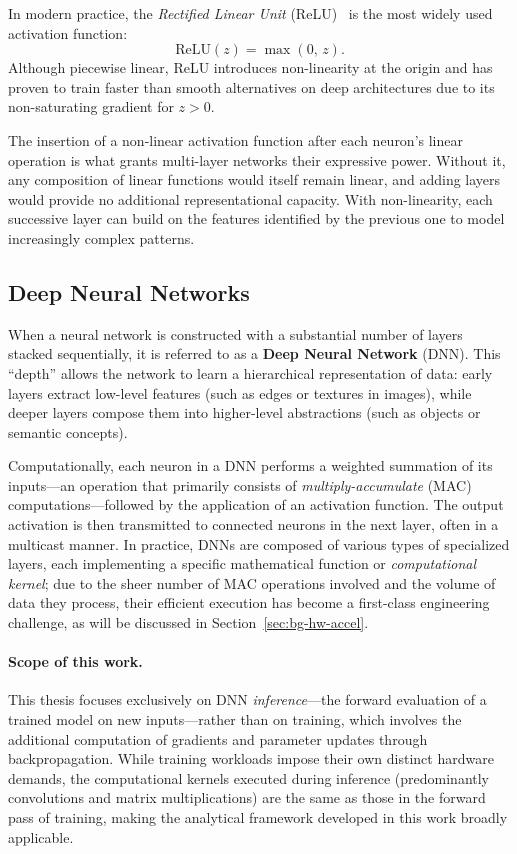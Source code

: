 In modern practice, the \emph{Rectified Linear Unit}
(ReLU)~\cite{relu_glorot} is the most widely used activation function:
\begin{equation}
\label{eq:relu}
\text{ReLU}(z) = \max(0,\,z).
\end{equation}
Although piecewise linear, ReLU introduces non-linearity at the origin and
has proven to train faster than smooth alternatives on deep architectures
due to its non-saturating gradient for $z > 0$.

The insertion of a non-linear activation function after each neuron's
linear operation is what grants multi-layer networks their expressive power.
Without it, any composition of linear functions would itself remain
linear, and adding layers would provide no additional representational
capacity.
With non-linearity, each successive layer can build on the features
identified by the previous one to model increasingly complex patterns.


\subsection{Deep Neural Networks}
\label{sec:dnn}

When a neural network is constructed with a substantial number of layers
stacked sequentially, it is referred to as a \textbf{Deep Neural Network}
(DNN).
This ``depth'' allows the network to learn a hierarchical representation
of data: early layers extract low-level features (such as edges or textures
in images), while deeper layers compose them into higher-level abstractions
(such as objects or semantic concepts).

Computationally, each neuron in a DNN performs a weighted summation of its
inputs---an operation that primarily consists of \emph{multiply-accumulate}
(MAC) computations---followed by the application of an activation function.
The output activation is then transmitted to connected neurons in the next
layer, often in a multicast manner.
In practice, DNNs are composed of various types of specialized
layers, each implementing a specific mathematical function or
\emph{computational kernel}; due to the sheer number of
MAC operations involved and the volume of data they process,
their efficient execution has become a first-class engineering challenge,
as will be discussed in Section~\ref{sec:bg-hw-accel}.

\paragraph{Scope of this work.}
This thesis focuses exclusively on DNN \emph{inference}---the forward
evaluation of a trained model on new inputs---rather than on training, 
which involves the additional computation of gradients and parameter
updates through backpropagation.
While training workloads impose their own distinct hardware demands,
the computational kernels executed during inference (predominantly
convolutions and matrix multiplications) are the same as those in the
forward pass of training, making the analytical framework developed in
this work broadly applicable.
